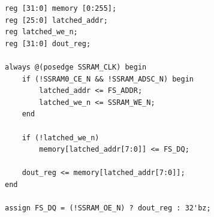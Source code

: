 \documentclass[13pt,a4paper]{article}
\begin{document}
\begin{lstlisting}[style=verilogstyle]
reg [31:0] memory [0:255];
reg [25:0] latched_addr;
reg latched_we_n;
reg [31:0] dout_reg;

always @(posedge SSRAM_CLK) begin
    if (!SSRAM0_CE_N && !SSRAM_ADSC_N) begin
        latched_addr <= FS_ADDR;
        latched_we_n <= SSRAM_WE_N;
    end

    if (!latched_we_n)
        memory[latched_addr[7:0]] <= FS_DQ;

    dout_reg <= memory[latched_addr[7:0]];
end

assign FS_DQ = (!SSRAM_OE_N) ? dout_reg : 32'bz;
\end{lstlisting}
\end{document}
